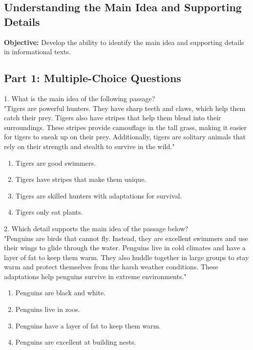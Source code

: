 \documentclass[12pt]{article}
\begin{document}
\subsection*{Understanding the Main Idea and Supporting Details}
\onehalfspacing

\begin{tcolorbox}[colframe=black!40, colback=gray!0, title=Learning Objective]
\textbf{Objective:} Develop the ability to identify the main idea and supporting details in informational texts.
\end{tcolorbox}

\subsection*{Part 1: Multiple-Choice Questions}

1. What is the main idea of the following passage? \\
"Tigers are powerful hunters. They have sharp teeth and claws, which help them catch their prey. Tigers also have stripes that help them blend into their surroundings. These stripes provide camouflage in the tall grass, making it easier for tigers to sneak up on their prey. Additionally, tigers are solitary animals that rely on their strength and stealth to survive in the wild."\\
\begin{enumerate}[label=\Alph*.]
    \item Tigers are good swimmers.
    \item Tigers have stripes that make them unique.
    \item Tigers are skilled hunters with adaptations for survival.
    \item Tigers only eat plants.
\end{enumerate}

\vspace{1cm}

2. Which detail supports the main idea of the passage below? \\
"Penguins are birds that cannot fly. Instead, they are excellent swimmers and use their wings to glide through the water. Penguins live in cold climates and have a layer of fat to keep them warm. They also huddle together in large groups to stay warm and protect themselves from the harsh weather conditions. These adaptations help penguins survive in extreme environments."\\
\begin{enumerate}[label=\Alph*.]
    \item Penguins are black and white.
    \item Penguins live in zoos.
    \item Penguins have a layer of fat to keep them warm.
    \item Penguins are excellent at building nests.
\end{enumerate}
\end{document}
